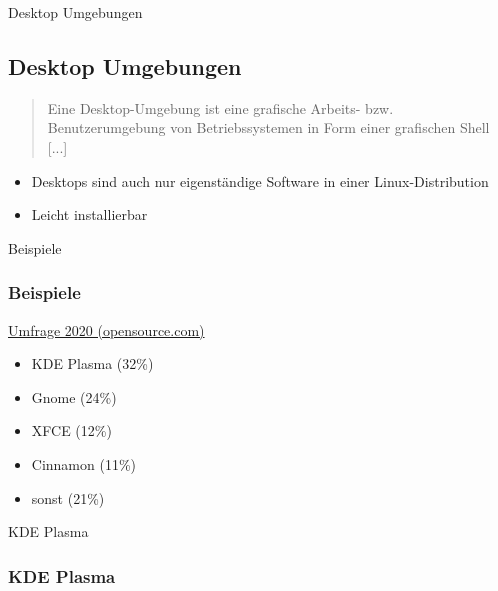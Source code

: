 \begin{frame}{Desktop Umgebungen}
    \subsection{Desktop Umgebungen}\label{subsec:desktop-umgebungen}

    \begin{quote}
        Eine Desktop-Umgebung ist eine grafische Arbeits- bzw. Benutzerumgebung von Betriebssystemen in Form einer grafischen Shell [...]
    \end{quote}

    \begin{itemize}
        \item Desktops sind auch nur eigenständige Software in einer Linux-Distribution
        \item Leicht installierbar
    \end{itemize}

\end{frame}

\begin{frame}{Beispiele}
    \subsubsection{Beispiele}\label{subsubsec:beispiele}

    \href{https://opensource.com/article/20/5/linux-desktops}{Umfrage 2020 (opensource.com)}

    \begin{itemize}
        \item KDE Plasma (32\%)
        \item Gnome (24\%)
        \item XFCE (12\%)
        \item Cinnamon (11\%)
        \item sonst (21\%)
    \end{itemize}

\end{frame}

\begin{frame}{KDE Plasma}
    \subsubsection{KDE Plasma}\label{subsubsec:KDE-Plasma}


\end{frame}

